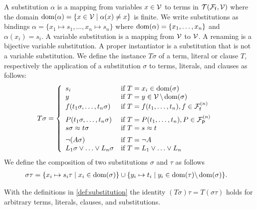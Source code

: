 
\begin{definition}\label{def:substitution}
	A {\myem substitution} $\alpha$ is a mapping from variables $x\in{\mathcal V}$ to terms in ${{\mathcal T}({\mathcal F}_{\mathsf f},{\mathcal V})}$
	where the {\myem domain }$\operatorname{dom}(\alpha) = \{ x\in{\mathcal V}\mid\alpha(x) \neq x \}$ is finite.
	We write substitutions as bindings $\alpha=\{ x_1\mapsto s_1,\ldots,x_n\mapsto s_n \}$
	where $\operatorname{dom}(\alpha)=\{ x_1,\ldots,x_n \}$ and $\alpha(x_i)=s_i$.
	A {\myem variable substitution} is a mapping from ${\mathcal V}$ to ${\mathcal V}$.
	A {\myem renaming} is a bijective variable substitution.
	A {\myem proper instantiator} is a substitution that is not a variable substitution.
	We define the instance $T\sigma$ of a term, literal or clause $T$,
	respectively the application of a substitution $\sigma$ to terms, literals, and clauses as follows:
	\begin{align*}
		T\sigma &= \left\{\begin{array}{ll}
			s_i 					& \text{if }T=x_i\in\operatorname{dom}(\sigma)\\
			y					& \text{if }T=y\in{\mathcal V}\,\backslash\operatorname{dom}(\sigma)\\
			f(t_1\sigma,\ldots,t_n\sigma)	&\text{if }T=f(t_1,\ldots,t_n), f\in{{\mathcal F}_{\mathsf f}^{(n)}} \\[0.5em]
			P(t_1\sigma,\ldots,t_n\sigma)	&\text{if }T=P(t_1,\ldots,t_n), P\in{{\mathcal F}_{\mathsf P}^{(n)}} \\
			s\sigma\approx t\sigma			&\text{if }T=s\approx t \\[0.5em]
			\lnot(A\sigma)					&\text{if }T=\lnot A \\
			L_1\sigma\lor\ldots\lor L_n\sigma	&\text{if }T=L_1\lor\ldots\lor L_n \\
		\end{array}\right.	
	\end{align*}
%	
	We define the {\myem composition} of two substitutions $\sigma$ and $\tau$ as follows
	\begin{align*}
		\sigma\tau&=\{ x_i\mapsto s_i\tau\mid x_i\in\operatorname{dom}(\sigma) \}
		\cup
		\{ y_i\mapsto t_i\mid y_i\in\operatorname{dom}(\tau) \backslash \operatorname{dom}(\sigma) \}.
	\end{align*}
	
\end{definition}

\begin{lemma}\label{lem:substitution}
	With the definitions in \ref{def:substitution} the identity
	$(T\sigma)\tau = T(\sigma\tau)$ holds for
	arbitrary terms, literals, clauses, and substitutions.
\end{lemma}